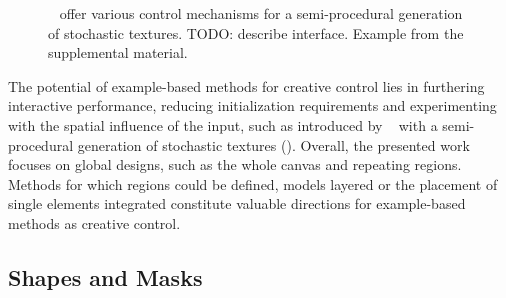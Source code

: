 \begin{figure}[H]
    \centering
    \label{fig:guehl_2020_stu}
    \caption{\citeauthor*{guehl_2020_stu}~\cite{guehl_2020_stu} offer various control mechanisms for a semi-procedural generation of stochastic textures. TODO: describe interface. Example from the supplemental material. \color{orange}{Status rights: Wiley requested}}
\end{figure}

The potential of example-based methods for creative control lies in furthering interactive performance, reducing initialization requirements and experimenting with the spatial influence of the input, such as introduced by \citeauthor*{guehl_2020_stu}~\cite{guehl_2020_stu} with a semi-procedural generation of stochastic textures (). Overall, the presented work focuses on global designs, such as the whole canvas and repeating regions. Methods for which regions could be defined, models layered or the placement of single elements integrated constitute valuable directions for example-based methods as creative control.



\subsection{Shapes and Masks}
\label{subsubsec:analysis_creative_means_shapes}

